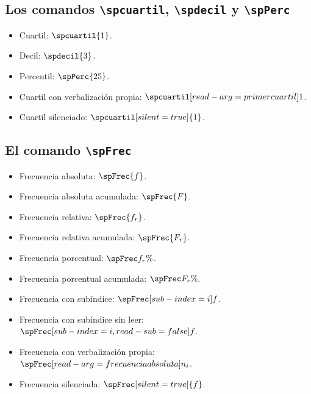 \documentclass{article}
\begin{document}
\subsection*{Los comandos \texttt{\textbackslash spcuartil}, \texttt{\textbackslash spdecil} y \texttt{\textbackslash spPerc}}

\begin{itemize}
  \item Cuartil: $\spcuartil{1}$.
  \item Decil: $\spdecil{3}$.
  \item Percentil: $\spPerc{25}$.
  \item Cuartil con verbalización propia: $\spcuartil[read-arg={primer cuartil}]{1}$.
  \item Cuartil silenciado: $\spcuartil[silent=true]{1}$.
\end{itemize}

\subsection*{El comando \texttt{\textbackslash spFrec}}

\begin{itemize}
  \item Frecuencia absoluta: $\spFrec{f}$.
  \item Frecuencia absoluta acumulada: $\spFrec{F}$.
  \item Frecuencia relativa: $\spFrec{f_{r}}$.
  \item Frecuencia relativa acumulada: $\spFrec{F_{r}}$.
  \item Frecuencia porcentual: $\spFrec{f_{r}\%}$.
  \item Frecuencia porcentual acumulada: $\spFrec{F_{r}\%}$.
  \item Frecuencia con subíndice: $\spFrec[sub-index={i}]{f}$.
  \item Frecuencia con subíndice sin leer: $\spFrec[sub-index={i},read-sub=false]{f}$.
  \item Frecuencia con verbalización propia: $\spFrec[read-arg={frecuencia absoluta}]{n_{i}}$.
  \item Frecuencia silenciada: $\spFrec[silent=true]{f}$.
\end{itemize}
\end{document}
